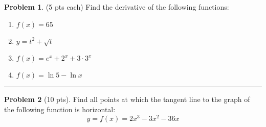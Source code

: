 \documentclass[12pt]{article}
\theoremstyle{definition}
\newtheorem{problem}{Problem}
\begin{document}
\begin{problem}(5 pts each)
  Find the derivative of the following functions:
  \begin{enumerate}
  \item $f(x) = 65$
    \begin{flushright}
    \end{flushright}
  \item $y = t^2 + \sqrt{t}$
    \begin{flushright}
    \end{flushright}
  \item $f(x) = e^x + 2^x + 3 \cdot 3^x$
    \begin{flushright}
    \end{flushright}
  \item $f(x) = \ln 5 - \ln x$
    \begin{flushright}
    \end{flushright}
  \end{enumerate}
\end{problem}
\hrule

\begin{problem}[10 pts]
  Find all points at which the tangent line to the graph of the following function is horizontal:
  \begin{equation*}
    y = f(x) = 2x^3 - 3x^2 - 36x
  \end{equation*}

  \vspace{7cm}
  \begin{flushright}
  \end{flushright}
\end{problem}
\newpage
\end{document}
